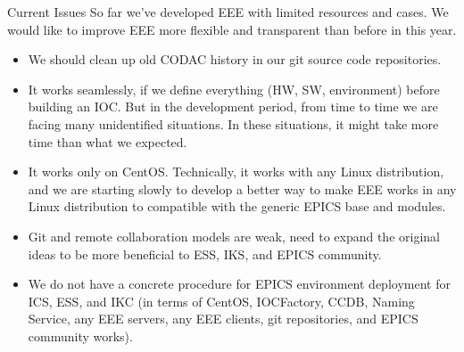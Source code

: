 \documentclass[
  8pt
  , table
  , ignorenonframetext
]{beamer}
\begin{document}
\begin{frame}{Current Issues}
  So far we've developed EEE with limited resources and cases. We would like to improve EEE more flexible and transparent than before in this year.
  
  \begin{itemize}
  \item We should clean up old CODAC history in our git source code repositories. 
  \item It works seamlessly, if we define everything (HW, SW, environment) before building an IOC. But in the development period, from time to time we are facing many unidentified situations. In these situations, it might take more time than what we expected.
  \item It works only on CentOS. Technically, it works with any Linux distribution, and we are starting slowly to develop a better way to make EEE works in any Linux distribution to compatible with the generic EPICS base and modules.
  \item Git and remote collaboration models are weak, need to expand the original ideas to be more beneficial to ESS, IKS, and EPICS community.
  \item We do not have a concrete procedure for EPICS environment deployment for ICS, ESS, and IKC (in terms of CentOS, IOCFactory, CCDB, Naming Service, any EEE servers, any EEE clients, git repositories, and EPICS community works).
  \end{itemize}
\end{frame}
\end{document}
